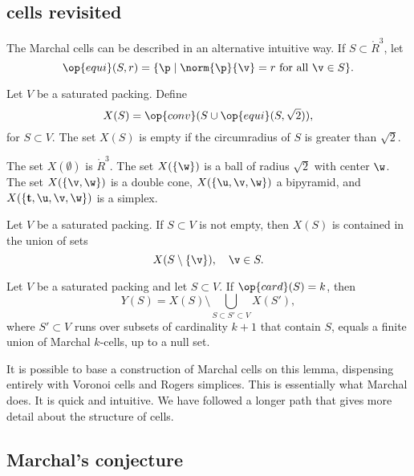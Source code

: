 





\subsection{cells revisited}

The Marchal cells can be described in an alternative intuitive way.
If $S\subset\ring{R}^3$, let
\[
\op{equi}(S,r) = \{ \p \mid \norm{\p}{\v} = r \text{ for all } \v \in S \}.
\]


Let $V$ be a saturated packing.
Define
\[
X(S) = \op{conv} (S\cup\op{equi}(S, \sqrt2) ),
\]
for $S\subset V$.  The set $X(S)$ is empty if the circumradius of $S$
is greater than $\sqrt2$.

The set $X(\emptyset)$ is $\ring{R}^3$.  The set $X(\{\w\})$ is a ball
of radius $\sqrt2$ with center $\w$.  The set $X(\{\v,\w\})$ is a
double cone, $X(\{\u,\v,\w\})$ a bipyramid, and $X(\{{\mathbf
  t},\u,\v,\w\})$ is a simplex.

\begin{lemma}
Let $V$ be a saturated packing.
If $S\subset V$ is not empty, then $X(S)$ is contained in the union of sets
\[
X(S\setminus \{\v\}),  \quad \v\in S.
\]
\end{lemma}

\begin{lemma}
Let $V$ be a saturated packing and let $S\subset V$. 
 If $\op{card}(S)=k$, then
\[Y(S) = X(S) \setminus \bigcup_{S\subset S'\subset V} X(S'),\]
where $S'\subset V$ runs over subsets of cardinality $k+1$ that contain $S$,
equals a finite union of Marchal $k$-cells, up to a null set.
\end{lemma}

It is possible to base a construction of Marchal cells on this lemma,
dispensing entirely with Voronoi cells and Rogers simplices.  This is
essentially what Marchal does.  It is quick and intuitive.  We have
followed a longer path that gives more detail about the structure of
cells.



\subsection{Marchal's conjecture}

